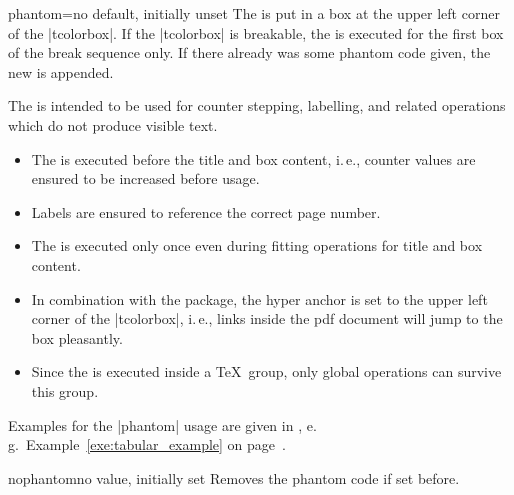 \begin{docTcbKey}{phantom}{=}{no default, initially unset}
The  is put in a box at the upper left corner of the |tcolorbox|.
If the |tcolorbox| is breakable, the  is executed for the first box of
the break sequence only. If there already was some phantom code given, the
new  is appended.\par
The  is intended to be used for counter stepping, labelling, and
related operations which do not produce visible text.
\begin{itemize}
\item The  is executed before the title and box content, i.\,e., counter
  values are ensured to be increased before usage.
\item Labels are ensured to reference the correct page number.
\item The  is executed only once even during fitting operations for
  title and box content.
\item In combination with the  package, the hyper anchor is set
  to the upper left corner of the |tcolorbox|, i.\,e., links inside the pdf document
  will jump to the box pleasantly.
\item Since the  is executed inside a \TeX\ group, only global
  operations can survive this group.
\end{itemize}
Examples for the |phantom| usage are given in , e.\,g.\
Example~\ref{exe:tabular_example} on page~\pageref{exe:tabular_example}.
\end{docTcbKey}

\begin{docTcbKey}{nophantom}{}{no value, initially set}
Removes the phantom code if set before.
\end{docTcbKey}




